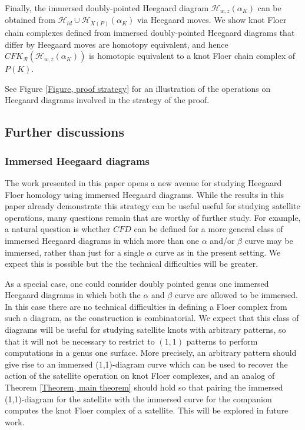 \documentclass{amsart}
\theoremstyle{definition}
\theoremstyle{remark}
\numberwithin{equation}{section}
\numberwithin{equation}{section} \makeatletter
\begin{document}
Finally, the immersed doubly-pointed Heegaard diagram $\mathcal{H}_{w,z}(\alpha_K)$ can be obtained from $\mathcal{H}_{id}\cup \mathcal{H}_{X(P)}(\alpha_K)$ via Heegaard moves. We show knot Floer chain complexes defined from immersed doubly-pointed Heegaard diagrams that differ by Heegaard moves are homotopy
equivalent, and hence $CFK_\mathcal{R}(\mathcal{H}_{w,z}(\alpha_K))$ is homotopic equivalent to a knot Floer chain complex of $P(K)$.

See Figure \ref{Figure, proof strategy} for an illustration of the operations on Heegaard diagrams involved in the strategy of the proof. 

 
\subsection{Further discussions}
\subsubsection{Immersed Heegaard diagrams}
The work presented in this paper opens a new avenue for studying Heegaard Floer homology using immersed Heegaard diagrams. While the results in this paper already demonstrate this strategy can be useful useful for studying satellite operations, many questions remain that are worthy of further study. For example, a natural question is whether $CFD$ can be defined for a more general class of immersed Heegaard diagrams in which more than one $\alpha$ and/or $\beta$ curve may be immersed, rather than just for a single $\alpha$ curve as in the present setting. We expect this is possible but the the technical difficulties will be greater.


As a special case, one could consider doubly pointed genus one immersed Heegaard diagrams in which both the $\alpha$ and $\beta$ curve are allowed to be immersed. In this case there are no technical difficulties in defining a Floer complex from such a diagram, as the construction is combinatorial. We expect that this class of diagrams will be useful for studying satellite knots with arbitrary patterns, so that it will not be necessary to restrict to $(1,1)$ patterns to perform computations in a genus one surface. More precisely, an arbitrary pattern should give rise to an immersed (1,1)-diagram curve which can be used to recover the action of the satellite operation on knot Floer complexes, and an analog of Theorem \ref{Theorem, main theorem} should hold so that pairing the immersed (1,1)-diagram for the satellite with the immersed curve for the companion computes the knot Floer complex of a satellite. This will be explored in future work.
\end{document}
